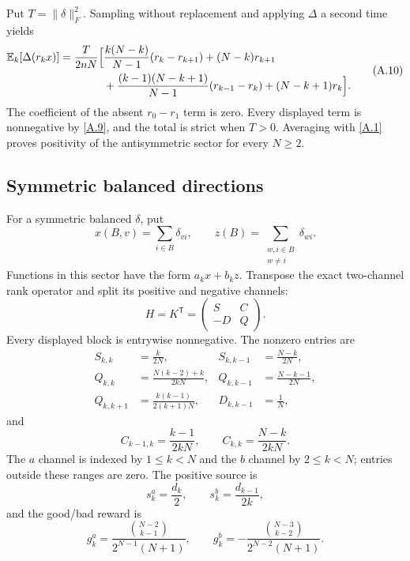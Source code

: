 Put $T=\|\delta\|_F^2$.  Sampling without replacement and applying
$\Delta$ a second time yields
\[
\begin{aligned}
 \mathbb E_k[\Delta(r_kx)]={\frac{T}{2nN}}\Big[&
 {\frac{k(N-k)}{ N-1}}(r_k-r_{k+1})+(N-k)r_{k+1}\\
 &+{\frac{(k-1)(N-k+1)}{ N-1}}(r_{k-1}-r_k)
 +(N-k+1)r_k\Big].
\end{aligned}                                               \tag{A.10}\label{A.10}
\]
The coefficient of the absent $r_0-r_1$ term is zero.  Every displayed term
is nonnegative by \eqref{A.9}, and the total is strict when $T>0$.
Averaging with \eqref{A.1} proves positivity of the antisymmetric sector for
every $N\ge2$.

\subsection{Symmetric balanced directions}

For a symmetric balanced $\delta$, put
\[
 x(B,v)=\sum_{i\in B}\delta_{vi},\qquad
 z(B)=\sum_{\substack{w,i\in B\\w\ne i}}\delta_{wi}.       \tag{A.11}\label{A.11}
\]
Functions in this sector have the form $a_kx+b_kz$.  Transpose the exact
two-channel rank operator and split its positive and negative channels:
\[
 H=K^{\mathsf T}=\begin{pmatrix}S&C\\-D&Q\end{pmatrix}.     \tag{A.12}\label{A.12}
\]
Every displayed block is entrywise nonnegative.  The nonzero entries are
\[
\begin{aligned}
 S_{k,k}&={\frac{k}{2N}},&S_{k,k-1}&={\frac{N-k}{2N}},\\
 Q_{k,k}&={\frac{N(k-2)+k}{2kN}},
 &Q_{k,k-1}&={\frac{N-k-1}{2N}},\\
 Q_{k,k+1}&={\frac{k(k-1)}{2(k+1)N}},
 &D_{k,k-1}&={\frac{1}{ N}},
\end{aligned}                                               \tag{A.13}\label{A.13}
\]
and
\[
 C_{k-1,k}={\frac{k-1}{2kN}},\qquad C_{k,k}={\frac{N-k}{2kN}}.      \tag{A.14}\label{A.14}
\]
The $a$ channel is indexed by $1\le k<N$ and the $b$ channel by
$2\le k<N$; entries outside these ranges are zero.  The positive source is
\[
 s_k^a={\frac{d_k}{2}},\qquad s_k^b={\frac{d_{k-1}}{2k}},            \tag{A.15}\label{A.15}
\]
and the good/bad reward is
\[
 g_k^a={\frac{\binom{N-2}{k-1}}{2^{N-1}(N+1)}},\qquad
 g_k^b=-{\frac{\binom{N-3}{k-2}}{2^{N-2}(N+1)}}.                \tag{A.16}\label{A.16}
\]

